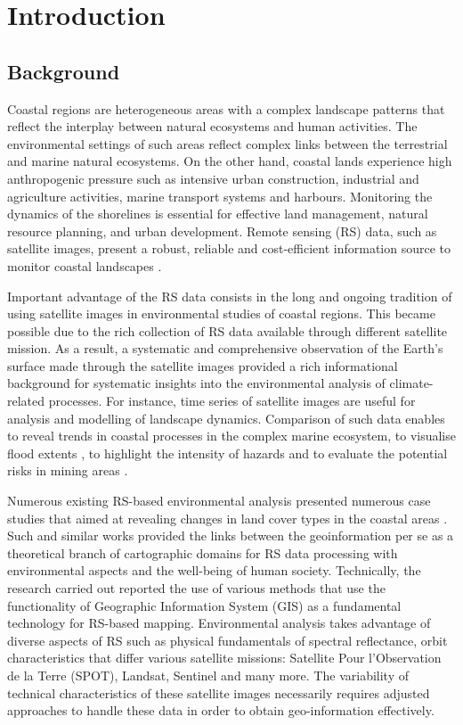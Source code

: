 \documentclass[jmse,article,submit,pdftex,moreauthors]{Definitions/mdpi}
\begin{document}
\section{Introduction}
\subsection{Background}
Coastal regions are heterogeneous areas with a complex landscape patterns that reflect the interplay between natural ecosystems and human activities. The environmental settings of such areas reflect complex links between the terrestrial and marine natural ecosystems. On the other hand, coastal lands experience high anthropogenic pressure such as intensive urban construction, industrial and agriculture activities, marine transport systems and harbours. Monitoring the dynamics of the shorelines is essential for effective land management, natural resource planning, and urban development. Remote sensing (RS) data, such as satellite images, present a robust, reliable and cost-efficient information source to monitor coastal landscapes \cite{AGATE2024108639,Lemenkova202405,LIU2024120096}. 

Important advantage of the RS data consists in the long and ongoing tradition of using satellite images in environmental studies of coastal regions. This became possible due to the rich collection of RS data available through different satellite mission. As a result, a systematic and comprehensive observation of the Earth's surface made through the satellite images provided a rich informational background for systematic insights into the environmental analysis of climate-related processes. For instance, time series of satellite images are useful for analysis and modelling of landscape dynamics. Comparison of such data enables to reveal trends in coastal processes in the complex marine ecosystem, to visualise flood extents \cite{10282975}, to highlight the intensity of hazards \cite{8517662} and to evaluate the potential risks in mining areas \cite{8900280}. 

Numerous existing RS-based environmental analysis presented numerous case studies that aimed at revealing changes in land cover types in the coastal areas \cite{geosciences12100357,976724,Lemenkova202211,6723424}. Such and similar works provided the links between the geoinformation per se as a theoretical branch of cartographic domains for RS data processing with environmental aspects and the well-being of human society. Technically, the research carried out reported the use of various methods that use the functionality of Geographic Information System (GIS) as a fundamental technology for RS-based mapping. Environmental analysis takes advantage of diverse aspects of RS such as physical fundamentals of spectral reflectance, orbit characteristics that differ various satellite missions: Satellite Pour l'Observation de la Terre (SPOT), Landsat, Sentinel and many more. The variability of technical characteristics of these satellite images necessarily requires adjusted approaches to handle these data in order to obtain geo-information effectively. 
\end{document}
